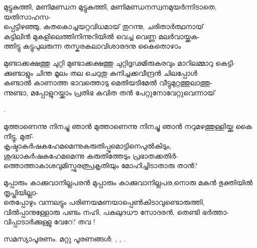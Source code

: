 \begin{enumerate}

\begin{slokam}{\VKm}{\VKG}{മുട്ടുകുത്തി, മണിമണ്ഡന}
മുട്ടുകുത്തി, മണിമണ്ഡനസ്വനമുയർന്നിടാതെ, യതിസാഹസ-\\
പ്പെട്ടിഴഞ്ഞു, കതകൊച്ചയറ്റവിധമായ്‌ തുറന്നു, ചരിതാർത്ഥനായ്‌\\
കട്ടിലിൻ മുകളിലെത്തിനിന്നുറിയിൽ വെച്ച വെണ്ണ മലർവായ്ക്കക-\\
ത്തിട്ടു കട്ടുപുലരുന്ന തസ്കരകലാവിശാരദനു കൈതൊഴാം
\end{slokam}



\begin{slokam}{\VSr}{\PG}{മുണ്ടാക്കക്ഷത്തു ചുറ്റി}
മുണ്ടാക്കക്ഷത്തു ചുറ്റിദ്ദൃഢമിരുകരവും മാറിലമ്മാറു കെട്ടി-\\
ക്കുണ്ടാളും ചിന്ത മൂലം തല ചെറുതു കുനിച്ചക്കവീന്ദ്രൻ ചിലപ്പോള്‍\\
കണ്ടാൽ കാണാത്ത ഭാവത്തൊടു മെതിയടിമേൽ വീട്ടുമുറ്റത്തുലാത്തു-\\
ന്നുണ്ടാ, മപ്പോളുറയ്ക്കാം പ്രതിഭ കവിത തൻ പേറ്റുനോവേറ്റുവെന്നായ്‌
\end{slokam}


.


\begin{slokam}{\VSv}{\DSN}{മുത്താണെന്നു നിനച്ചു ഞാൻ}
മുത്താണെന്നു നിനച്ചു ഞാൻ നറുമഴത്തുള്ളിയ്ക്കു കൈ നീട്ടു, മുത്-\\
കൃഷ്ടാകർഷകഹേമമെന്നുകരുതിപ്പൂമൊട്ടിനെപുൽകിടും,\\
ശുദ്ധാകർഷകഹേമമെന്നു കരുതിത്തേടും പ്രഭാതക്കതിർ-\\
ത്തൊത്താകാശവുമിസ്ഫുരത്പ്രകൃതിയും മോഹിച്ചിടാതാരു താൻ?
\end{slokam}




\begin{slokam}{\VSr}{\ONN}{മുപ്പാരും കാക്കുവാനില്ലപരൻ}
മുപ്പാരും കാക്കുവാനില്ലപര,നൊരു മകൻ ഭുക്തിയിൽ തൃപ്തിയില്ലാ-\\
തെപ്പോഴും വന്നലട്ടും പരിണയമണയാപ്പെൺകിടാവുണ്ടൊരുത്തി,\\
വിൽപ്പാനുള്ളോരു പണ്ടം നഹി, പകലുദധൗ സോദരൻ, തെണ്ടി ഭർത്താ-\\
വിപ്പാടാർക്കുള്ളു വേറേ? തവ !
\end{slokam}



സമസ്യാപൂരണം. മറ്റു പൂരണങ്ങൾ: , , .



\end{enumerate}
